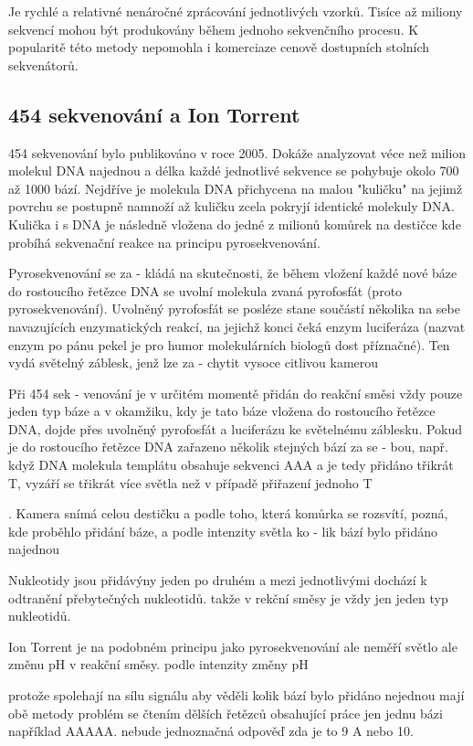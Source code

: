 \documentclass[czech,DP]{thesiskiv}
\begin{document}
Je rychlé a relativné nenáročné zprácování jednotlivých vzorků. Tisíce až miliony sekvencí mohou být produkovány během jednoho sekvenčního procesu. K popularitě této metody nepomohla i komerciaze cenově dostupních stolních sekvenátorů.


\subsection{454 sekvenování a Ion Torrent}
454 sekvenování bylo publikováno v roce 2005. Dokáže analyzovat véce než milion molekul DNA najednou a délka každé jednotlivé sekvence se pohybuje okolo 700 až 1000 bází.
Nejdříve je molekula DNA přichycena na malou "kuličku" na jejimž povrchu se postupně namnoží až kuličku zcela pokryjí identické molekuly DNA.
Kulička i s DNA je následně vložena do jedné z milionů komůrek na destičce kde probíhá sekvenační reakce na principu pyrosekvenování.

 Pyrosekvenování se za -
kládá na skutečnosti, že během vložení
každé nové báze do rostoucího řetězce
DNA se uvolní molekula zvaná pyrofosfát
(proto pyrosekvenování). Uvolněný pyrofosfát se posléze stane součástí několika
na sebe navazujících enzymatických reakcí, na jejichž konci čeká enzym luciferáza
(nazvat enzym po pánu pekel je pro humor
molekulárních biologů dost příznačné).
Ten vydá světelný záblesk, jenž lze za -
chytit vysoce citlivou kamerou

 Při 454 sek -
venování je v určitém momentě přidán do
reakční směsi vždy pouze jeden typ báze
a v okamžiku, kdy je tato báze vložena do
rostoucího řetězce DNA, dojde přes uvolněný pyrofosfát a luciferázu ke světelnému
záblesku. Pokud je do rostoucího řetězce
DNA zařazeno několik stejných bází za se -
bou, např. když DNA molekula templátu
obsahuje sekvenci AAA a je tedy přidáno
třikrát T, vyzáří se třikrát více světla než
v případě přiřazení jednoho T

. Kamera
snímá celou destičku a podle toho, která
komůrka se rozsvítí, pozná, kde proběhlo
přidání báze, a podle intenzity světla ko -
lik bází bylo přidáno najednou

Nukleotidy jsou přidávýny jeden po druhém a mezi jednotlivými dochází k odtranění přebytečných nukleotidů.
takže v rekční směsy je vždy jen jeden typ nukleotidů.

Ion Torrent je na podobném principu jako pyrosekvenování
ale neměří světlo ale změnu pH v reakční směsy.
podle intenzity změny pH

protože spolehají na sílu signálu aby věděli kolik bází bylo přidáno  nejednou mají obě metody problém se čtením dělších řetězců obsahující práce jen jednu bázi například AAAAA. nebude jednoznačná odpověď zda je to 9 A nebo 10.
\end{document}
